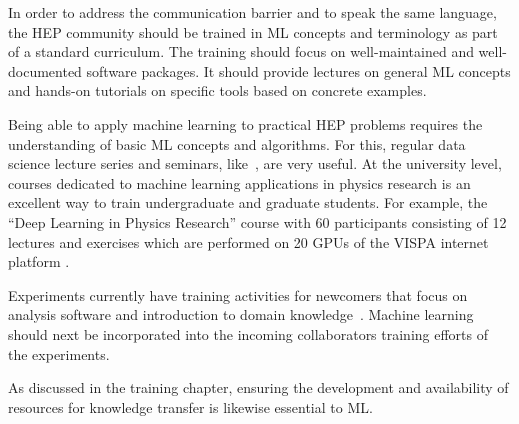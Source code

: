 
In order to address the communication barrier and to speak the same language, the HEP community should be trained in ML concepts and terminology as part of a standard curriculum. The training should focus on well-maintained and well-documented software packages. It should provide lectures on general ML concepts and hands-on tutorials on specific tools based on concrete examples.

Being able to apply machine learning to practical HEP problems requires the understanding of basic ML concepts and algorithms. For this, regular data science lecture series and seminars, like~\cite{mlhep}, are very useful. At the university level, courses dedicated to machine learning applications in physics research is an excellent way to train undergraduate and graduate students. For example, the ``Deep Learning in Physics Research'' course with 60 participants consisting of 12 lectures and exercises which are performed on 20 GPUs of the VISPA internet platform \cite{vispa}. %

Experiments currently have training activities for newcomers that focus on analysis software and introduction to domain knowledge~\cite{2016chep.confE.334B}. Machine learning should next be incorporated into the incoming collaborators training efforts of the experiments.

As discussed in the training chapter, ensuring the development and availability of resources for knowledge transfer is likewise essential to ML. %





